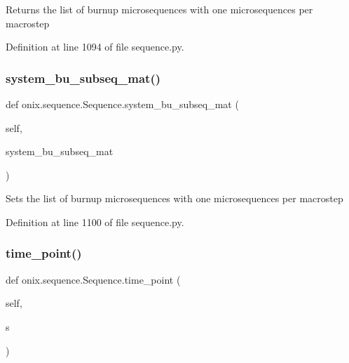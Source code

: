 \begin{DoxyVerb}Returns the list of burnup microsequences with one microsequences per macrostep
\end{DoxyVerb}
 

Definition at line 1094 of file sequence.\+py.

\mbox{\label{classonix_1_1sequence_1_1Sequence_a59ce4ba65b6e12a5a4230ccd6b0f4215}} 
\subsubsection{\texorpdfstring{system\+\_\+bu\+\_\+subseq\+\_\+mat()}{system\_bu\_subseq\_mat()}\hspace{0.1cm}{\footnotesize\ttfamily [2/2]}}
{\footnotesize\ttfamily def onix.\+sequence.\+Sequence.\+system\+\_\+bu\+\_\+subseq\+\_\+mat (\begin{DoxyParamCaption}\item[{}]{self,  }\item[{}]{system\+\_\+bu\+\_\+subseq\+\_\+mat }\end{DoxyParamCaption})}

\begin{DoxyVerb}Sets the list of burnup microsequences with one microsequences per macrostep
\end{DoxyVerb}
 

Definition at line 1100 of file sequence.\+py.

\mbox{\label{classonix_1_1sequence_1_1Sequence_af34c5779028d0a5a354849868ad4f0a6}} 
\subsubsection{\texorpdfstring{time\+\_\+point()}{time\_point()}}
{\footnotesize\ttfamily def onix.\+sequence.\+Sequence.\+time\+\_\+point (\begin{DoxyParamCaption}\item[{}]{self,  }\item[{}]{s }\end{DoxyParamCaption})}

